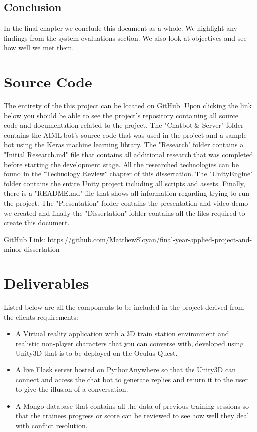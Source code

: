 \subsection{Conclusion}
In the final chapter we conclude this document as a whole. We highlight any findings from the system evaluations section. We also look at objectives and see how well we met them.

\section{Source Code}
The entirety of the this project can be located on GitHub. Upon clicking the link below you should be able to see the project's repository containing all source code and documentation related to the project. The "Chatbot \& Server" folder contains the AIML bot's source code that was used in the project and a sample bot using the Keras machine learning library. The "Research" folder contains a "Initial Research.md" file that contains all additional research that was completed before starting the development stage. All the researched technologies can be found in the "Technology Review" chapter of this dissertation. The "UnityEngine" folder contains the entire Unity project including all scripts and assets. Finally, there is a "README.md" file that shows all information regarding trying to run the project. The "Presentation" folder contains the presentation and video demo we created and finally the "Dissertation" folder contains all the files required to create this document.
\newline

GitHub Link: https://github.com/MatthewSloyan/final-year-applied-project-and-minor-dissertation

\section{Deliverables}
Listed below are all the components to be included in the project derived from the clients requirements:

\begin{itemize}
    \item A Virtual reality application with a 3D train station environment and realistic non-player characters that you can converse with, developed using Unity3D that is to be deployed on the Oculus Quest.
    
    \item A live Flask server hosted on PythonAnywhere so that the Unity3D can connect and access the chat bot to generate replies and return it to the user to give the illusion of a conversation.
    
    \item A Mongo database that contains all the data of previous training sessions so that the trainees progress or score can be reviewed to see how well they deal with conflict resolution. 
\end{itemize}
\newpage

